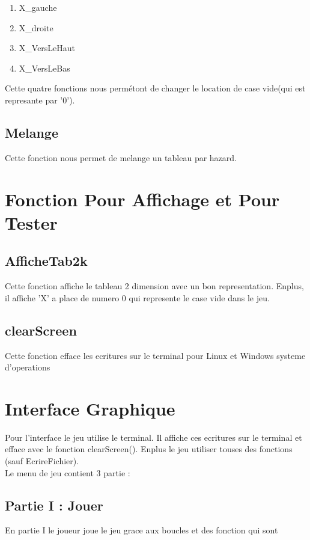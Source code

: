 \documentclass{article}
\begin{document}
\begin{enumerate}
	\item X\_gauche 			
	\item X\_droite 			
	\item X\_VersLeHaut		
	\item X\_VersLeBas		
\end{enumerate}

Cette quatre fonctions nous permétont de changer le location de case vide(qui est represante par '0'). 
	

\subsection{Melange}
Cette fonction nous permet de melange un tableau par hazard.

\section{Fonction Pour Affichage et Pour Tester}

\subsection{AfficheTab2k}
Cette fonction affiche le tableau 2 dimension avec un bon representation. Enplus, il affiche 'X' a place de numero 0 qui represente le case vide dans le jeu.

\subsection{clearScreen}
Cette fonction efface les ecritures sur le terminal pour Linux et Windows systeme d'operations

\section{Interface Graphique}
Pour l'interface le jeu utilise le terminal. Il affiche ces ecritures sur le terminal et efface avec le fonction clearScreen(). Enplus le jeu utiliser touses des fonctions (sauf EcrireFichier).
\\
Le menu de jeu contient 3 partie :

\subsection{Partie I : Jouer}
En partie I le joueur joue le jeu grace aux boucles et des fonction qui sont 
\end{document}
